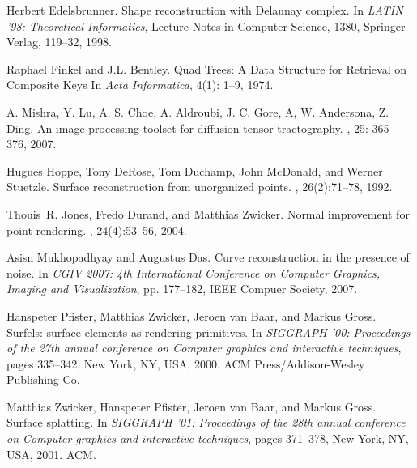 \documentclass{article}
\numberwithin{cntr}{section}
\numberwithin{equation}{section}
\begin{document}
\begin{thebibliography}{99}
Herbert Edelsbrunner.
\newblock Shape reconstruction with Delaunay complex.
\newblock In {\em LATIN '98: Theoretical Informatics}, Lecture Notes
in Computer Science, 1380, Springer-Verlag, 119--32, 1998.

Raphael Finkel and J.L. Bentley.
\newblock Quad Trees: A Data Structure for Retrieval on Composite Keys
\newblock In {\em Acta Informatica}, 4(1): 1--9, 1974.

A. Mishra, Y. Lu, A. S. Choe, A. Aldroubi, J. C. Gore,
A, W. Andersona, Z. Ding.
\newblock An image-processing toolset for diffusion tensor tractography.
, 25: 365--376, 2007.

Hugues Hoppe, Tony DeRose, Tom Duchamp, John McDonald, and Werner Stuetzle.
\newblock Surface reconstruction from unorganized points.
, 26(2):71--78, 1992.

Thouis~R. Jones, Fredo Durand, and Matthias Zwicker.
\newblock Normal improvement for point rendering.
, 24(4):53--56, 2004.

Asisn Mukhopadhyay and Augustus Das.
\newblock Curve reconstruction in the presence of noise.
\newblock In {\em CGIV 2007: 4th International Conference on
Computer Graphics, Imaging and Visualization}, pp. 177--182,
IEEE Compuer Society, 2007.

Hanspeter Pfister, Matthias Zwicker, Jeroen van Baar, and Markus Gross.
\newblock Surfels: surface elements as rendering primitives.
\newblock In {\em SIGGRAPH '00: Proceedings of the 27th annual conference on
  Computer graphics and interactive techniques}, pages 335--342, New York, NY,
  USA, 2000. ACM Press/Addison-Wesley Publishing Co.

Matthias Zwicker, Hanspeter Pfister, Jeroen van Baar, and Markus Gross.
\newblock Surface splatting.
\newblock In {\em SIGGRAPH '01: Proceedings of the 28th annual conference on
  Computer graphics and interactive techniques}, pages 371--378, New York, NY,
  USA, 2001. ACM.

\end{thebibliography}
\end{document}
